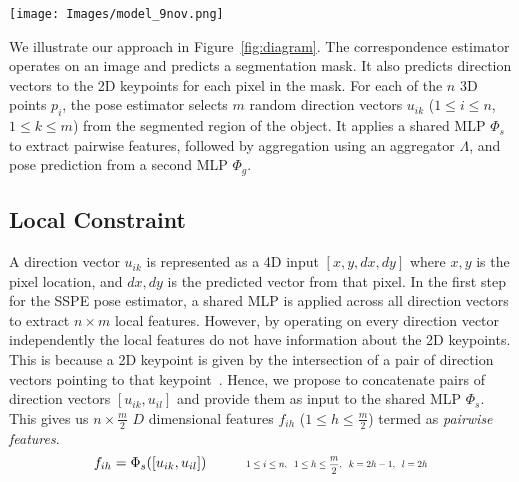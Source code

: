 \documentclass{article}
\begin{document}
\begin{figure*}[t]
\centering
\texttt{[image: Images/model\_9nov.png]}
\caption{Illustration of our network architecture (SSPE-ours). The correspondence estimator predicts direction vectors to the 2D keypoints. Pairs of direction vectors are passed through a shared network $\Phi_s$ to give pairwise features which are aggregated using an aggregator $\Lambda$, and passed through a second network $\Phi_g$ to predict the pose. The color of the pairwise features indicates association to a 3D point.}
\label{fig:diagram}
\end{figure*}














We illustrate our approach in Figure~\ref{fig:diagram}. The correspondence estimator operates on an image and predicts a segmentation mask. It also predicts direction vectors to the 2D keypoints for each pixel in the mask. For each of the $n$ 3D points $p_i$, the pose estimator selects $m$ random direction vectors $u_{ik}$ ($1 \leq i \leq n$, $1 \leq k \leq m$) from the segmented region of the object. It applies a shared MLP $\Phi_s$ to extract pairwise features, followed by aggregation using an aggregator $\Lambda$, and pose prediction from a second MLP $\Phi_g$.






\subsection{Local Constraint}



A direction vector $u_{ik}$ is represented as a 4D input $[x, y, dx, dy]$ where $x,y$ is the pixel location, and $dx, dy$ is the predicted vector from that pixel. In the first step for the SSPE pose estimator, a shared MLP is applied across all direction vectors to extract $n \times m$ local features. 
However, 
by operating on every direction vector independently the local features do not have information about the 2D keypoints. This is because a 2D keypoint is given by the intersection of a pair of direction vectors pointing to that keypoint~\cite{peng2019pvnet}. Hence, we propose to concatenate pairs of direction vectors $[u_{ik}, u_{il}]$ and provide them as input to the shared MLP $\Phi_s$. This gives us $n \times \frac{m}{2}$ $D$ dimensional
features $f_{ih}$ ($1 \leq h \leq \frac{m}{2}$) termed as \textit{pairwise features}.
\begin{equation}
f_{ih} = \Phi_s([u_{ik}, u_{il}]) \hspace{1cm} \scaleto{1 \leq i \leq n, \hspace{0.2cm} 1 \leq h \leq \frac{m}{2}, \hspace{0.2cm} k=2h-1, \hspace{0.2cm} l=2h}{12pt}
\end{equation}
\end{document}
